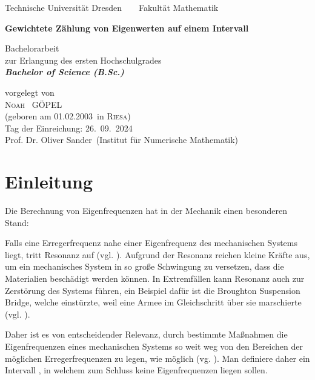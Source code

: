 \documentclass[a4paper,12pt]{report}
\newcommand{\name}{Göpel}
\newcommand{\vorname}{Noah}
\newcommand{\gebdatum}{01.02.2003}
\newcommand{\ort}{Riesa}
\newcommand{\betreuer}{Prof. Dr. Oliver Sander}
\newcommand{\institut}{Institut für Numerische Mathematik}
\newcommand{\thema}{Gewichtete Zählung von Eigenwerten auf einem Intervall}
\newcommand{\datum}{26.\ 09.\ 2024} %
\newcommand{\1}{\mathds{1}}
\theoremstyle{plain} %
\theoremstyle{definition} %
\theoremstyle{remark}
\begin{document}

\thispagestyle{empty}

\begin{center}
{\Large Technische Universit\"{a}t Dresden\  \ \textbullet\ \ Fakult\"{a}t Mathematik}

\vfil

{\bfseries\Huge\thema}

\vfil
{\LARGE
Bachelorarbeit \\[\bigskipamount]
zur Erlangung des ersten Hochschulgrades\\[\bigskipamount]
\bfseries{\itshape Bachelor of Science  \textup{(}B.Sc.\textup{)}}\\[\bigskipamount]
}

\vfil\vfil

\vfil

vorgelegt von
\\[\bigskipamount]
\textsc{\vorname\ } \MakeUppercase{\name}
\\[\bigskipamount]
(geboren am \gebdatum\ in \textsc{\ort})
\\[\bigskipamount]
Tag der Einreichung: \datum
\\[\bigskipamount]
\betreuer\ (\institut)
\end{center}

\cleardoublepage
\tableofcontents
\clearpage
\listofsymbols
\clearpage
\listoffigures
\bigskip
\listoftables

\chapter{Einleitung}
\label{sec: Einleitung}
      
      Die Berechnung von Eigenfrequenzen hat in der Mechanik einen besonderen Stand:

      Falls eine Erregerfrequenz nahe einer Eigenfrequenz des mechanischen Systems liegt, tritt Resonanz auf (vgl. \cite[S. 435]{maschinendynamikDresig}).
      Aufgrund der Resonanz reichen kleine Kräfte aus, um ein mechanisches System in so große Schwingung zu versetzen, dass die Materialien beschädigt werden können.
      In Extremfällen kann Resonanz auch zur Zerstörung des Systems führen, ein Beispiel dafür ist die Broughton Suspension Bridge, welche einstürzte, weil eine Armee im Gleichschritt über sie marschierte (vgl. \cite{brücken}).

      Daher ist es von entscheidender Relevanz, durch bestimmte Maßnahmen die Eigenfrequenzen eines mechanischen Systems so weit weg von den Bereichen der möglichen Erregerfrequenzen zu legen, wie möglich (vg. \cite[S. 520]{maschinendynamikDresig}).
      Man definiere daher ein Intervall \wAwB, in welchem zum Schluss keine Eigenfrequenzen liegen sollen.
      
\end{document}
